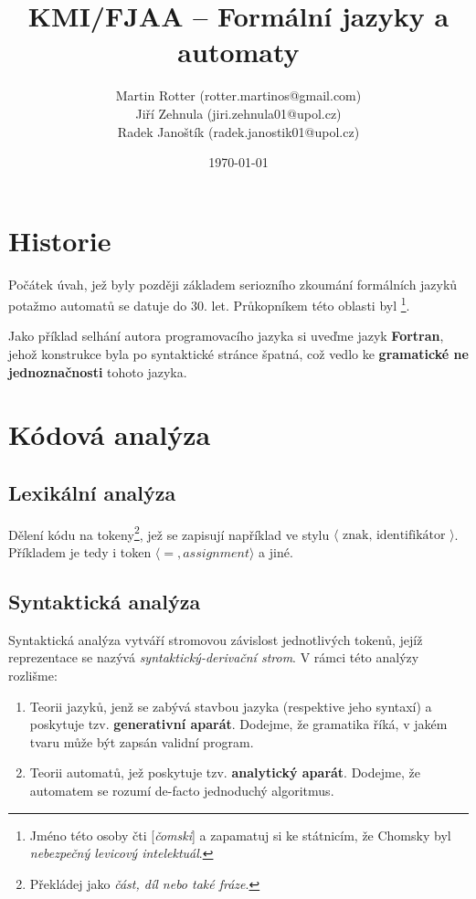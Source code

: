 \documentclass[10pt, a4paper, titlepage]{article}
\title{KMI/FJAA  -- Formální jazyky a automaty}
\author{Martin Rotter (rotter.martinos@gmail.com) \\
	Jiří Zehnula (jiri.zehnula01@upol.cz) \\
	Radek Janoštík (radek.janostik01@upol.cz)}
\date{\today}
\theoremstyle{note}
\begin{document}
\maketitle

\section{Historie}
Počátek úvah, jež byly později základem seriozního zkoumání formálních jazyků potažmo automatů se datuje do 30. let.
Průkopníkem této oblasti byl 
\footnote{Jméno této osoby čti [\emph{čomski}] a zapamatuj si ke státnicím, že Chomsky byl \emph{nebezpečný levicový intelektuál}.}.

Jako příklad selhání autora programovacího jazyka si uveďme jazyk \textbf{Fortran}, jehož konstrukce byla po syntaktické stránce špatná,
což vedlo ke \textbf{gramatické ne jednoznačnosti} tohoto jazyka.

\section{Kódová analýza}
\subsection{Lexikální analýza}
Dělení kódu na tokeny\footnote{Překládej jako \emph{část, díl nebo také fráze}.}, jež se zapisují například ve stylu
$\langle\text{ znak, identifikátor }\rangle$.
Příkladem je tedy i token $\langle =, assignment \rangle$ a jiné.

\subsection{Syntaktická analýza}
Syntaktická analýza vytváří stromovou závislost jednotlivých tokenů, jejíž reprezentace se nazývá \emph{syntaktický-derivační strom}.
V rámci této analýzy rozlišme:
\begin{enumerate}
\item
Teorii jazyků, jenž se zabývá stavbou jazyka (respektive jeho syntaxí) a poskytuje tzv. \textbf{generativní aparát}.
Dodejme, že gramatika říká, v jakém tvaru může být zapsán validní program.

\item
Teorii automatů, jež poskytuje tzv. \textbf{analytický aparát}.
Dodejme, že automatem se rozumí de-facto jednoduchý algoritmus.
\end{enumerate}
\end{document}
